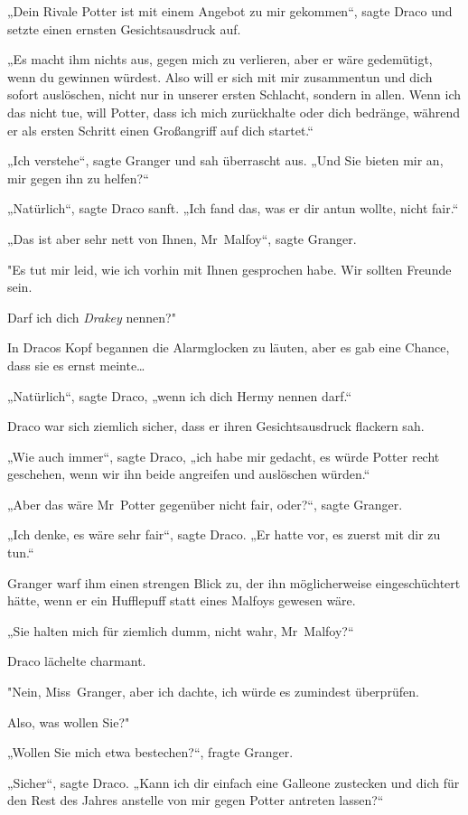 {„Dein Rivale Potter ist mit einem Angebot zu mir gekommen“, sagte Draco und setzte einen ernsten Gesichtsausdruck auf.

„Es macht ihm nichts aus, gegen mich zu verlieren, aber er wäre gedemütigt, wenn du gewinnen würdest. Also will er sich mit mir zusammentun und dich sofort auslöschen, nicht nur in unserer ersten Schlacht, sondern in allen. Wenn ich das nicht tue, will Potter, dass ich mich zurückhalte oder dich bedränge, während er als ersten Schritt einen Großangriff auf dich startet.“

„Ich verstehe“, sagte Granger und sah überrascht aus. „Und Sie bieten mir an, mir gegen ihn zu helfen?“

„Natürlich“, sagte Draco sanft. „Ich fand das, was er dir antun wollte, nicht fair.“

„Das ist aber sehr nett von Ihnen, Mr~Malfoy“, sagte Granger.

"Es tut mir leid, wie ich vorhin mit Ihnen gesprochen habe. Wir sollten Freunde sein.

Darf ich dich \emph{Drakey} nennen?"

In Dracos Kopf begannen die Alarmglocken zu läuten, aber es gab eine Chance, dass sie es ernst meinte…

„Natürlich“, sagte Draco, „wenn ich dich Hermy nennen darf.“

Draco war sich ziemlich sicher, dass er ihren Gesichtsausdruck flackern sah.

„Wie auch immer“, sagte Draco, „ich habe mir gedacht, es würde Potter recht geschehen, wenn wir ihn beide angreifen und auslöschen würden.“

„Aber das wäre Mr~Potter gegenüber nicht fair, oder?“, sagte Granger.

„Ich denke, es wäre sehr fair“, sagte Draco. „Er hatte vor, es zuerst mit dir zu tun.“

Granger warf ihm einen strengen Blick zu, der ihn möglicherweise eingeschüchtert hätte, wenn er ein Hufflepuff statt eines Malfoys gewesen wäre.

„Sie halten mich für ziemlich dumm, nicht wahr, Mr~Malfoy?“

Draco lächelte charmant.

"Nein, Miss~Granger, aber ich dachte, ich würde es zumindest überprüfen.

Also, was wollen Sie?"

„Wollen Sie mich etwa bestechen?“, fragte Granger.

„Sicher“, sagte Draco. „Kann ich dir einfach eine Galleone zustecken und dich für den Rest des Jahres anstelle von mir gegen Potter antreten lassen?“

}
